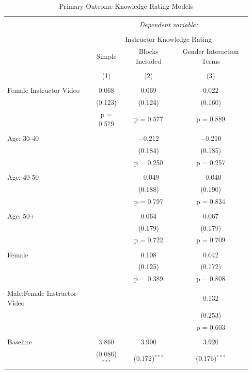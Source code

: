 \documentclass[
]{article}
\begin{document}
\begin{table}[!htbp] \centering 
  \caption{Primary Outcome Knowledge Rating Models} 
  \label{} 
\small 
\begin{tabular}{@{\extracolsep{3pt}}lccc} 
\\[-1.8ex]\hline 
\hline \\[-1.8ex] 
 & \multicolumn{3}{c}{\textit{Dependent variable:}} \\ 
\cline{2-4} 
\\[-1.8ex] & \multicolumn{3}{c}{Instructor Knowledge Rating} \\ 
 & Simple & Blocks Included & Gender Interaction Terms \\ 
\\[-1.8ex] & (1) & (2) & (3)\\ 
\hline \\[-1.8ex] 
 Female Instructor Video & 0.068 & 0.069 & 0.022 \\ 
  & (0.123) & (0.124) & (0.160) \\ 
  & p = 0.579 & p = 0.577 & p = 0.889 \\ 
  & & & \\ 
 Age: 30-40 &  & $-$0.212 & $-$0.210 \\ 
  &  & (0.184) & (0.185) \\ 
  &  & p = 0.250 & p = 0.257 \\ 
  & & & \\ 
 Age: 40-50 &  & $-$0.049 & $-$0.040 \\ 
  &  & (0.188) & (0.190) \\ 
  &  & p = 0.797 & p = 0.834 \\ 
  & & & \\ 
 Age: 50+ &  & 0.064 & 0.067 \\ 
  &  & (0.179) & (0.179) \\ 
  &  & p = 0.722 & p = 0.709 \\ 
  & & & \\ 
 Female &  & 0.108 & 0.042 \\ 
  &  & (0.125) & (0.172) \\ 
  &  & p = 0.389 & p = 0.808 \\ 
  & & & \\ 
 Male:Female Instructor Video &  &  & 0.132 \\ 
  &  &  & (0.253) \\ 
  &  &  & p = 0.603 \\ 
  & & & \\ 
 Baseline & 3.860 & 3.900 & 3.920 \\ 
  & (0.086)$^{***}$ & (0.172)$^{***}$ & (0.176)$^{***}$ \\ 

\end{tabular}
\end{table}
\end{document}
